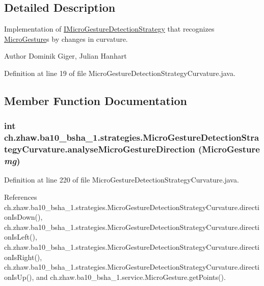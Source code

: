 \subsection{Detailed Description}
Implementation of \hyperlink{interfacech_1_1zhaw_1_1ba10__bsha__1_1_1strategies_1_1IMicroGestureDetectionStrategy}{IMicroGestureDetectionStrategy} that recognizes \hyperlink{}{MicroGesture}s by changes in curvature.

\begin{DoxyAuthor}{Author}
Dominik Giger, Julian Hanhart 
\end{DoxyAuthor}


Definition at line 19 of file MicroGestureDetectionStrategyCurvature.java.

\subsection{Member Function Documentation}
\hypertarget{classch_1_1zhaw_1_1ba10__bsha__1_1_1strategies_1_1MicroGestureDetectionStrategyCurvature_a8290d90ed16b0c2e0a14ab7de9cb1493}{
\subsubsection[{analyseMicroGestureDirection}]{\setlength{\rightskip}{0pt plus 5cm}int ch.zhaw.ba10\_\-bsha\_\-1.strategies.MicroGestureDetectionStrategyCurvature.analyseMicroGestureDirection ({\bf MicroGesture} {\em mg})}}
\label{classch_1_1zhaw_1_1ba10__bsha__1_1_1strategies_1_1MicroGestureDetectionStrategyCurvature_a8290d90ed16b0c2e0a14ab7de9cb1493}


Definition at line 220 of file MicroGestureDetectionStrategyCurvature.java.

References ch.zhaw.ba10\_\-bsha\_\-1.strategies.MicroGestureDetectionStrategyCurvature.directionIsDown(), ch.zhaw.ba10\_\-bsha\_\-1.strategies.MicroGestureDetectionStrategyCurvature.directionIsLeft(), ch.zhaw.ba10\_\-bsha\_\-1.strategies.MicroGestureDetectionStrategyCurvature.directionIsRight(), ch.zhaw.ba10\_\-bsha\_\-1.strategies.MicroGestureDetectionStrategyCurvature.directionIsUp(), and ch.zhaw.ba10\_\-bsha\_\-1.service.MicroGesture.getPoints().

